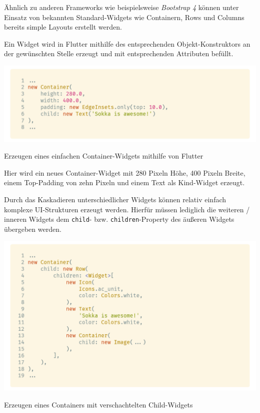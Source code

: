 Ähnlich zu anderen Frameworks wie beispielsweise \textit{Bootstrap 4} können unter Einsatz von bekannten Standard-Widgets wie Containern, Rows und Columns bereits simple Layouts erstellt werden.

\newpage

Ein Widget wird in Flutter mithilfe des entsprechenden Objekt-Konstruktors an der gewünschten Stelle erzeugt und mit entsprechenden Attributen befüllt.

\begin{code}
    \centering
    \includegraphics[width=1\textwidth]{images/Flutter/flutterCreateContainer.png}
    \vspace{-25pt}
    \caption{Erzeugen eines einfachen Container-Widgets mithilfe von Flutter}
\end{code}

Hier wird ein neues Container-Widget mit 280 Pixeln Höhe,
400 Pixeln Breite, einem Top-Padding von zehn Pixeln und einem Text als Kind-Widget erzeugt.

Durch das Kaskadieren unterschiedlicher Widgets können relativ einfach komplexe UI-Strukturen erzeugt werden. Hierfür müssen lediglich die weiteren / inneren Widgets dem \lstinline{child}- bzw. \lstinline{children}-Property des äußeren Widgets übergeben werden.

\begin{code}
    \centering
    \includegraphics[width=1\textwidth]{images/Flutter/flutterCreateCascadingContainer.png}
    \vspace{-25pt}
    \caption{Erzeugen eines Containers mit verschachtelten Child-Widgets}
\end{code}

